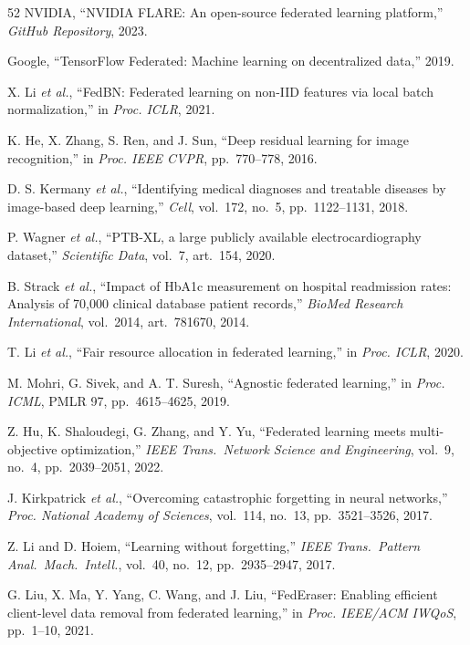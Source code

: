 \documentclass[conference]{IEEEtran}
\begin{document}
\begin{thebibliography}{52}
NVIDIA, ``NVIDIA FLARE: An open-source federated learning platform,'' \textit{GitHub Repository}, 2023.

Google, ``TensorFlow Federated: Machine learning on decentralized data,'' 2019.

X. Li \textit{et al.}, ``FedBN: Federated learning on non-IID features via local batch normalization,'' in \textit{Proc. ICLR}, 2021.

K. He, X. Zhang, S. Ren, and J. Sun, ``Deep residual learning for image recognition,'' in \textit{Proc. IEEE CVPR}, pp.~770--778, 2016.

D. S. Kermany \textit{et al.}, ``Identifying medical diagnoses and treatable diseases by image-based deep learning,'' \textit{Cell}, vol.~172, no.~5, pp.~1122--1131, 2018.

P. Wagner \textit{et al.}, ``PTB-XL, a large publicly available electrocardiography dataset,'' \textit{Scientific Data}, vol.~7, art.~154, 2020.

B. Strack \textit{et al.}, ``Impact of HbA1c measurement on hospital readmission rates: Analysis of 70,000 clinical database patient records,'' \textit{BioMed Research International}, vol.~2014, art.~781670, 2014.

T. Li \textit{et al.}, ``Fair resource allocation in federated learning,'' in \textit{Proc. ICLR}, 2020.

M. Mohri, G. Sivek, and A. T. Suresh, ``Agnostic federated learning,'' in \textit{Proc. ICML}, PMLR 97, pp.~4615--4625, 2019.

Z. Hu, K. Shaloudegi, G. Zhang, and Y. Yu, ``Federated learning meets multi-objective optimization,'' \textit{IEEE Trans.~Network Science and Engineering}, vol.~9, no.~4, pp.~2039--2051, 2022.

J. Kirkpatrick \textit{et al.}, ``Overcoming catastrophic forgetting in neural networks,'' \textit{Proc. National Academy of Sciences}, vol.~114, no.~13, pp.~3521--3526, 2017.

Z. Li and D. Hoiem, ``Learning without forgetting,'' \textit{IEEE Trans.~Pattern Anal.~Mach.~Intell.}, vol.~40, no.~12, pp.~2935--2947, 2017.

G. Liu, X. Ma, Y. Yang, C. Wang, and J. Liu, ``FedEraser: Enabling efficient client-level data removal from federated learning,'' in \textit{Proc. IEEE/ACM IWQoS}, pp.~1--10, 2021.


\end{thebibliography}
\end{document}
